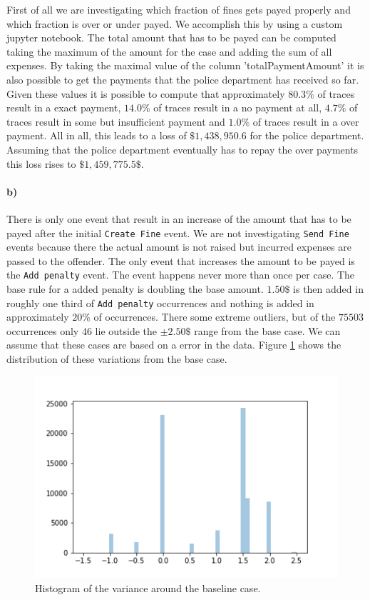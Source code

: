 \documentclass[12pt]{report}
\begin{document}
First of all we are investigating which fraction of fines gets payed properly and which fraction is over or under payed. We accomplish this by using a custom jupyter notebook. The total amount that has to be payed can be computed taking the maximum of the amount for the case and adding the sum of all expenses. By taking the maximal value of the column 'totalPaymentAmount' it is also possible to get the payments that the police department has received so far. Given these values it is possible to compute that approximately $80.3\%$ of traces result in a exact payment, $14.0\%$ of traces result in a no payment at all, $4.7\%$ of traces result in some but insufficient payment and $1.0\%$ of traces result in a over payment. All in all, this leads to a loss of $ \$ 1,438,950.6$ for the police department. Assuming that the police department eventually has to repay the over payments this loss rises to $ \$ 1,459,775.5 \$ $.

\paragraph{\textbf{b)}}
There is only one event that result in an increase of the amount that has to be payed after the initial \texttt{Create Fine} event. We are not investigating \texttt{Send Fine} events because there the actual amount is not raised but incurred expenses are passed to the offender. The only event that increases the amount to be payed is the 
\texttt{Add penalty} event. The event happens never more than once per case. The base rule for a added penalty is doubling the base amount. $1.50\$ $ is then added in roughly one third of \texttt{Add penalty} occurrences and nothing is added in approximately $20\% $ of occurrences. There some extreme outliers, but of the $75503$ occurrences only $46$ lie outside the $ \pm 2.50\$ $ range from the base case. We can assume that these cases are based on a error in the data. Figure \ref{fig:baselineVar} shows the distribution of these variations from the base case.


\begin{figure}[H]
  \centering
  \includegraphics[width=\textwidth]{figures/baselineVar.png}
  \caption{Histogram of the variance around the baseline case.}
  \label{fig:baselineVar}
\end{figure}
\end{document}
